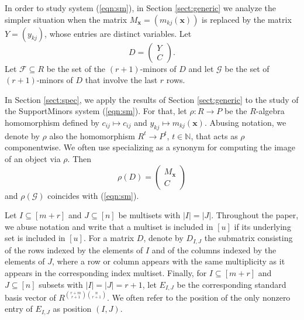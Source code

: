 \documentclass[utf8,latin1]{article}
\renewcommand{\vec}[1]{\ensuremath{ \mathbf #1 }}
\begin{document}
\bigskip

In order to study system (\ref{eqn:sm}), in Section \ref{sect:generic} we analyze the simpler situation when the matrix $M_\vec{x}=(m_{kj}(\vec{x}))$ is replaced by the matrix $Y=(y_{kj})$, whose entries are distinct variables. Let
$$D = 
\begin{pmatrix}
	Y \\
	C
\end{pmatrix}.$$
Let $\mathcal{F} \subseteq R$ be the set of the $(r+1)$-minors of $D$ and let $\mathcal{G}$ be the set of $(r+1)$-minors of $D$ that involve the last $r$ rows. 

In Section \ref{sect:spec}, we apply the results of Section \ref{sect:generic} to the study of the SupportMinors system (\ref{eqn:sm}).
For that, let $\rho:R\rightarrow P$ be the $R$-algebra homomorphism defined by $c_{ij}\mapsto c_{ij}$ and $y_{kj}\mapsto m_{kj}(\vec{x})$. Abusing notation, we denote by $\rho$ also the homomorphism $R^t \rightarrow P^t$, $t \in \mathbb{N}$, that acts as $\rho$ componentwise. We often use specializing as a synonym for computing the image of an object via $\rho$. Then $$\rho(D)=\begin{pmatrix}
	M_{\vec{x}} \\
	C
\end{pmatrix}$$ 
and $\rho(\mathcal{G})$ coincides with (\ref{eqn:sm}).

Let $I\subseteq [m+r]$ and $J\subseteq [n]$ be multisets with $|I|=|J|$. Throughout the paper, we abuse notation and write that a multiset is included in $[u]$ if its underlying set is included in $[u]$. 
For a matrix $D$, denote by $D_{I,J}$ the submatrix consisting of the rows indexed by the elements of $I$ and of the columns indexed by the elements of $J$, where a row or column appears with the same multiplicity as it appears in the corresponding index multiset.
Finally, for $I\subseteq [m+r]$ and $J\subseteq [n]$ subsets with $|I|=|J|=r+1$, let $E_{I,J}$ be the corresponding standard basis vector of $R^{\binom{r+m}{r+1} \binom{n}{r+1}}$. We often refer to the position of the only nonzero entry of $E_{I,J}$ as position $(I,J)$.
\end{document}
